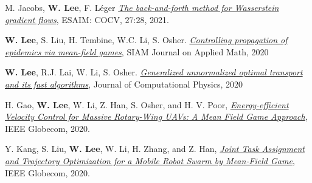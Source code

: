 \begin{cvparagraph}
\begin{cvitems}
    \medskip
    \item M. Jacobs, \textbf{W. Lee}, F. Léger \href{https://arxiv.org/pdf/2011.08151}{\textit{The back-and-forth method for Wasserstein gradient flows}}, {ESAIM: COCV}, 27:28, 2021.
    \medskip
    \item \textbf{W. Lee}, S. Liu, H. Tembine, W.C. Li, S. Osher. \href{https://www.researchgate.net/publication/341804278_Controlling_Propagation_of_epidemics_via_mean-field_games}{\textit{Controlling propagation of epidemics via mean-field games}}, {SIAM Journal on Applied Math}, 2020
    \medskip
    \item \textbf{W. Lee}, R.J. Lai, W. Li, S. Osher. \href{https://www.researchgate.net/publication/338990122_Generalized_Unnormalized_Optimal_Transport_and_its_fast_algorithms}{\textit{Generalized unnormalized optimal transport and its fast algorithms}}, {Journal of Computational Physics}, 2020
    \medskip
    \item H. Gao, \textbf{W. Lee}, W. Li, Z. Han, S. Osher, and H. V. Poor, \href{ftp://ftp.math.ucla.edu/pub/camreport/cam19-57.pdf}{\textit{Energy-efficient Velocity Control for Massive Rotary-Wing UAVs: A Mean Field Game Approach}}, {IEEE Globecom}, 2020.
    \medskip
    \item Y. Kang, S. Liu, \textbf{W. Lee}, W. Li, H. Zhang, and Z. Han, \href{https://ieeexplore.ieee.org/document/9322422}{\textit{Joint Task Assignment and Trajectory Optimization for a Mobile Robot Swarm by Mean-Field Game}}, {IEEE Globecom}, 2020.
  \end{cvitems}

\vspace{0.5cm}
\end{cvparagraph}